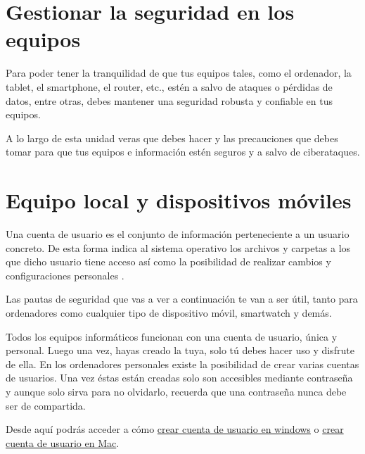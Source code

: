 \documentclass[
  spanish,
  a4paper,
  openany]{book}
\begin{document}
\hypertarget{gestionar-la-seguridad-en-los-equipos}{%
\section{Gestionar la seguridad en los equipos}\label{gestionar-la-seguridad-en-los-equipos}}

Para poder tener la tranquilidad de que tus equipos tales, como el ordenador, la tablet, el smartphone, el router, etc., estén a salvo de ataques o pérdidas de datos, entre otras, debes mantener una seguridad robusta y confiable en tus equipos.

A lo largo de esta unidad veras que debes hacer y las precauciones que debes tomar para que tus equipos e información estén seguros y a salvo de ciberataques.

\hypertarget{equipo-local-y-dispositivos-muxf3viles}{%
\section{Equipo local y dispositivos móviles}\label{equipo-local-y-dispositivos-muxf3viles}}

Una cuenta de usuario es el conjunto de información perteneciente a un usuario concreto. De esta forma indica al sistema operativo los archivos y carpetas a los que dicho usuario tiene acceso así como la posibilidad de realizar cambios y configuraciones personales \citep{OSI-cuentas}.

Las pautas de seguridad que vas a ver a continuación te van a ser útil, tanto para ordenadores como cualquier tipo de dispositivo móvil, smartwatch y demás.

Todos los equipos informáticos funcionan con una cuenta de usuario, única y personal. Luego una vez, hayas creado la tuya, solo tú debes hacer uso y disfrute de ella. En los ordenadores personales existe la posibilidad de crear varias cuentas de usuarios. Una vez éstas están creadas solo son accesibles mediante contraseña y aunque solo sirva para no olvidarlo, recuerda que una contraseña nunca debe ser de compartida.

Desde aquí podrás acceder a cómo \href{https://support.microsoft.com/es-es/windows/crear-una-cuenta-de-administrador-o-de-usuario-local-en-windows-10-20de74e0-ac7f-3502-a866-32915af2a34d}{crear cuenta de usuario en windows} o \href{https://support.apple.com/es-es/guide/mac-help/mtusr001/mac\#:~:text=A\%C3\%B1adir\%20un\%20usuario,en\%20\%E2\%80\%9CUsuarios\%20y\%20grupos\%E2\%80\%9D.\&text=Si\%20el\%20candado\%20situado\%20en,bajo\%20la\%20lista\%20de\%20usuarios}{crear cuenta de usuario en Mac}.
\end{document}

